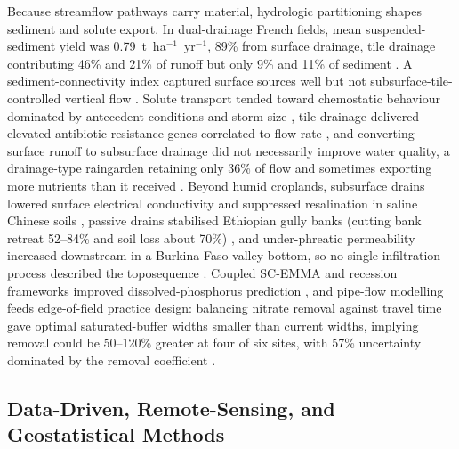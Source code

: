 \documentclass[11pt]{article}
\begin{document}
Because streamflow pathways carry material, hydrologic partitioning shapes sediment and solute export. In dual-drainage French fields, mean suspended-sediment yield was 0.79~t~ha$^{-1}$~yr$^{-1}$, 89\% from surface drainage, tile drainage contributing 46\% and 21\% of runoff but only 9\% and 11\% of sediment \parencite{Gaillot2023b,Grangeon2021}. A sediment-connectivity index captured surface sources well but not subsurface-tile-controlled vertical flow \parencite{Calsamiglia2018}. Solute transport tended toward chemostatic behaviour dominated by antecedent conditions and storm size \parencite{Stops2022}, tile drainage delivered elevated antibiotic-resistance genes correlated to flow rate \parencite{Rieke2018}, and converting surface runoff to subsurface drainage did not necessarily improve water quality, a drainage-type raingarden retaining only 36\% of flow and sometimes exporting more nutrients than it received \parencite{Xu2022}. Beyond humid croplands, subsurface drains lowered surface electrical conductivity and suppressed resalination in saline Chinese soils \parencite{Yan2013,Chang2012}, passive drains stabilised Ethiopian gully banks (cutting bank retreat 52--84\% and soil loss about 70\%) \parencite{Zegeye2021}, and under-phreatic permeability increased downstream in a Burkina Faso valley bottom, so no single infiltration process described the toposequence \parencite{Keita2014}. Coupled SC-EMMA and recession frameworks improved dissolved-phosphorus prediction \parencite{Nazari2021}, and pipe-flow modelling feeds edge-of-field practice design: balancing nitrate removal against travel time gave optimal saturated-buffer widths smaller than current widths, implying removal could be 50--120\% greater at four of six sites, with 57\% uncertainty dominated by the removal coefficient \parencite{McEachran2020}.

\subsection{Data-Driven, Remote-Sensing, and Geostatistical Methods}
\end{document}
